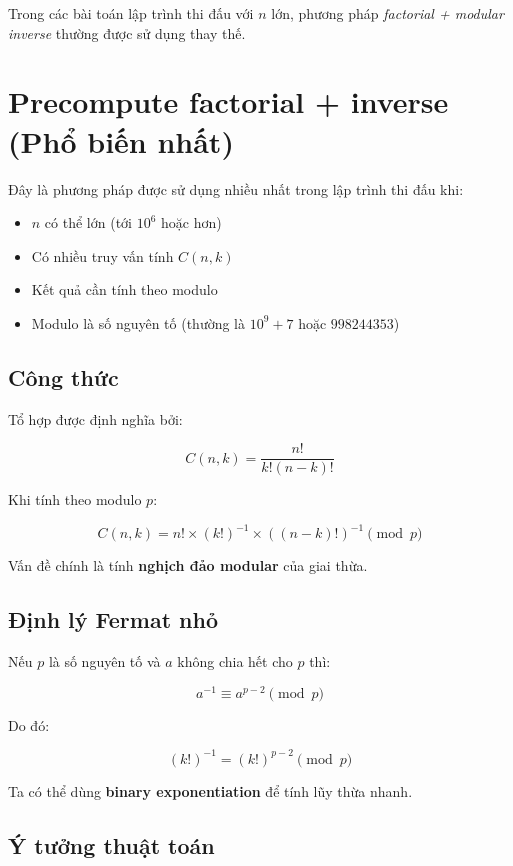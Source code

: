 Trong các bài toán lập trình thi đấu với $n$ lớn, phương pháp \textit{factorial + modular inverse} thường được sử dụng thay thế.

\newpage

\section{Precompute factorial + inverse (Phổ biến nhất)}

Đây là phương pháp được sử dụng nhiều nhất trong lập trình thi đấu khi:

\begin{itemize}
\item $n$ có thể lớn (tới $10^6$ hoặc hơn)
\item Có nhiều truy vấn tính $C(n,k)$
\item Kết quả cần tính theo modulo
\item Modulo là số nguyên tố (thường là $10^9+7$ hoặc $998244353$)
\end{itemize}

\subsection*{Công thức}

Tổ hợp được định nghĩa bởi:

\[
C(n,k) = \frac{n!}{k!(n-k)!}
\]

Khi tính theo modulo $p$:

\[
C(n,k) = n! \times (k!)^{-1} \times ((n-k)!)^{-1} \pmod p
\]

Vấn đề chính là tính \textbf{nghịch đảo modular} của giai thừa.

\subsection*{Định lý Fermat nhỏ}

Nếu $p$ là số nguyên tố và $a$ không chia hết cho $p$ thì:

\[
a^{-1} \equiv a^{p-2} \pmod p
\]

Do đó:

\[
(k!)^{-1} = (k!)^{p-2} \pmod p
\]

Ta có thể dùng \textbf{binary exponentiation} để tính lũy thừa nhanh.

\subsection*{Ý tưởng thuật toán}

